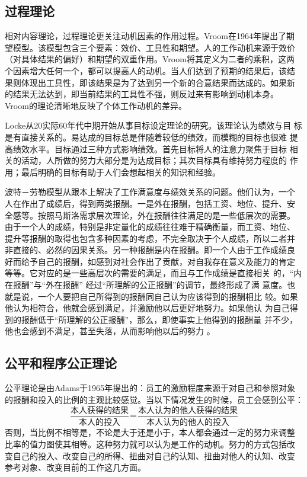 \documentclass[12pt,a4paper]{ctexart}
\begin{document}
\subsection{过程理论}
相对内容理论，过程理论更关注动机因素的作用过程。Vroom在1964年提出了期
望模型。该模型包含三个要素：效价、工具性和期望。人的工作动机来源于效价
（对具体结果的偏好）和期望的双重作用。Vroom将其定义为二者的乘积，这两
个因素增大任何一个，都可以提高人的动机。当人们达到了预期的结果后，该结
果则体现出工具性，即该结果是为了达到另一个新的合意结果而达成的。如果新
的结果无法达到，即当前结果的工具性不强，则反过来有影响到动机本身\cite{vroom1964wam}。
Vroom的理论清晰地反映了个体工作动机的差异。

Locke从20实际60年代中期开始从事目标设定理论的研究。该理论认为绩效与目
标是有直接关系的。易达成的目标总是伴随着较低的绩效，而模糊的目标也很难
提高绩效水平。目标通过三种方式影响绩效。首先目标将人的注意力聚焦于目标
相关的活动，人所做的努力大部分是为达成目标；其次目标具有维持努力程度的
作用；最后明确的目标有助于人们会想起相关的知识和经验\cite{locke1990tgs}。

波特－劳勒模型从跟本上解决了工作满意度与绩效关系的问题。他们认为，一个
人在作出了成绩后，得到两类报酬。一是外在报酬，包括工资、地位、提升、安
全感等。按照马斯洛需求层次理论，外在报酬往往满足的是一些低层次的需要。
由于一个人的成绩，特别是非定量化的成绩往往难于精确衡量，而工资、地位、
提升等报酬的取得也包含多种因素的考虑，不完全取决于个人成绩，所以二者并
非直接的、必然的因果关系。另一种报酬是内在报酬。即一个人由于工作成绩良
好而给予自己的报酬，如感到对社会作出了贡献，对自我存在意义及能力的肯定
等等。它对应的是一些高层次的需要的满足，而且与工作成绩是直接相关
的，“内在报酬”与“外在报酬” 经过“所理解的公正报酬”的调节，最终形成了满
意度。也就是说，一个人要把自己所得到的报酬同自己认为应该得到的报酬相比
较。如果他认为相符合，他就会感到满足，并激励他以后更好地努力。如果他认
为自己得到的报酬低于“所理解的公正报酬”，那么，即使事实上他得到的报酬量
并不少，他也会感到不满足，甚至失落，从而影响他以后的努力
\cite{porter1968maa}。 

\subsection{公平和程序公正理论}
公平理论是由Adams于1965年提出的：员工的激励程度来源于对自己和参照对象
的报酬和投入的比例的主观比较感觉。当以下情况发生的时候，员工会感到公平：
$$\frac{本人获得的结果}{本人的投入} ＝ \frac{本人认为的他人获得的结
  果}{本人认为的他人的投入}$$
否则，当比例不相等是，不论是大于还是小于，本人都会通过一定的努力来调整
比率的值力图使其相等。这种努力就可以认为是工作的动机。努力的方式包括改
变自己的投入、改变自己的所得、扭曲对自己的认知、扭曲对他人的认知、改变
参考对象、改变目前的工作这几方面\cite{adams1965ise}。
\end{document}
